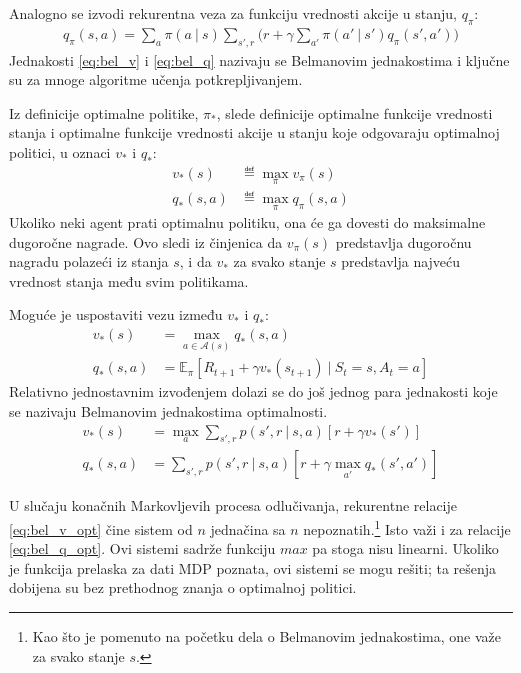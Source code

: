 Analogno se izvodi rekurentna veza za funkciju vrednosti akcije u stanju, $q_{\pi}$:
\begin{equation}
	\label{eq:bel_q}
	\begin{aligned}
		q_{\pi}(s,a) = \sum_{a}^{} \pi(a~|~s)\sum_{s', r}^{}\big( r+\gamma\sum_{a'}^{}\pi(a'~|~s') q_{\pi}(s', a') \big)
	\end{aligned}
\end{equation}
Jednakosti \eqref{eq:bel_v} i \eqref{eq:bel_q} nazivaju se Belmanovim jednakostima i ključne su za mnoge algoritme učenja potkrepljivanjem. 
\par 
Iz definicije optimalne politike, $\pi_*$, slede definicije optimalne funkcije vrednosti stanja i optimalne funkcije vrednosti akcije u stanju koje odgovaraju optimalnoj politici, u oznaci $v_*$ i $q_*$:
\begin{equation}
	\begin{aligned}
		v_*(s) &\eqdef \max_{\pi} v_{\pi} (s)	 \\
		q_*(s,a) &\eqdef \max_{\pi} q_{\pi}(s,a)
	\end{aligned}
\end{equation}
Ukoliko neki agent prati optimalnu politiku, ona će ga dovesti do maksimalne dugoročne nagrade. Ovo sledi iz činjenica da $v_{\pi}(s)$ predstavlja dugoročnu nagradu polazeći iz stanja $s$, i da $v_*$ za svako stanje $s$ predstavlja najveću vrednost stanja među svim politikama.
\par
Moguće je uspostaviti vezu između $v_*$ i $q_*$:
\begin{equation}
	\begin{aligned}
		v_*(s) &= \max_{a \in \mathcal{A}(s)} q_* (s,a)	 \\
		q_*(s,a) &= \mathbb{E}_{\pi}[R_{t+1} + \gamma v_*(s_{t+1})~|~S_t=s, A_t=a]
	\end{aligned}
\end{equation}
Relativno jednostavnim izvođenjem dolazi se do još jednog para jednakosti koje se nazivaju Belmanovim jednakostima optimalnosti.
	\begin{align}
		\label{eq:bel_v_opt} v_*(s) &= \max_{a}\sum_{s', r}^{} p(s', r~|~s,a)[r+\gamma v_*(s')]	 \\
		\label{eq:bel_q_opt} q_*(s,a) &= \sum_{s', r}^{} p(s', r~|~s,a)[r+\gamma \max_{a'}q_*(s',a')]
	\end{align}
\par 
U slučaju konačnih Markovljevih procesa odlučivanja, rekurentne relacije \eqref{eq:bel_v_opt} čine sistem od $n$ jednačina sa $n$ nepoznatih.\footnote{Kao što je pomenuto na početku dela o Belmanovim jednakostima, one važe za svako stanje $s$.} Isto važi i za relacije \eqref{eq:bel_q_opt}. Ovi sistemi sadrže funkciju $max$ pa stoga nisu linearni. Ukoliko je funkcija prelaska za dati MDP poznata, ovi sistemi se mogu rešiti; ta rešenja dobijena su bez prethodnog znanja o optimalnoj politici. 
